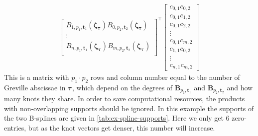 \begin{indentedexample}
\begin{equation*}
\begin{aligned}
\begin{bmatrix}
                B_{1, p_1, \mathbf{t}_1}(\boldsymbol{\zeta_\tau}) B_{0, p_2, \mathbf{t}_2}(\boldsymbol{\zeta_\tau}) \\
                \vdots \\
                B_{n, p_1, \mathbf{t}_1}(\boldsymbol{\zeta_\tau}) B_{m, p_2, \mathbf{t}_2}(\boldsymbol{\zeta_\tau}) \\
            \end{bmatrix}^\top 
            \begin{bmatrix}
                c_{0, 1} c_{0, 2} \\
                c_{0, 1} c_{1, 2} \\
                c_{0, 1} c_{2, 2} \\
                \vdots \\
                c_{0, 1} c_{m, 2} \\
                c_{1, 1} c_{0, 2} \\
                \vdots \\
                c_{n, 1} c_{m, 2}
            \end{bmatrix}                
        \end{aligned}
    \end{equation*}
    This is a matrix with $p_1 \cdot p_2$ rows and column number equal to the number of Greville abscissae in $\boldsymbol{\tau}$, which depend on the degrees of $\mathbf B_{p_1, \mathbf{t}_1}$ and $\mathbf B_{p_2, \mathbf{t}_2}$ and how many knots they share.
    In order to save computational resources, the products with non-overlapping supports should be ignored. In this example the supports of the two B-splines are given in \cref{tab:ex-spline-supports}. Here we only get 6 zero-entries, but as the knot vectors get denser, this number will increase.



\end{indentedexample}
